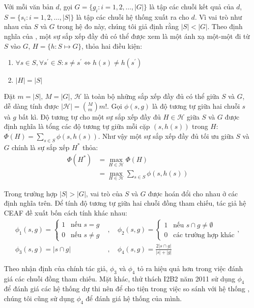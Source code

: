 Với mỗi văn bản $d$, gọi $G=\{g_i:i=1,2,\dots,|G|\}$ là tập các chuỗi kết quả của $d$, $S=\{s_i:i=1,2,\dots,|S|\}$ là tập các chuỗi hệ thống xuất ra cho $d$. Vì vai trò như nhau của $S$ và $G$ trong hệ đo này, chúng tôi giả định rằng $|S|<|G|$. Theo định nghĩa của \cite{XiaoquangLuo2005}, một sự sắp xếp đầy đủ có thể được xem là một ánh xạ một-một đi từ $S$ vào $G$, $H=\{h:S\mapsto G\}$, thỏa hai điều kiện:
\begin{enumerate}
\item $\forall s \in S,\forall s^{\prime} \in S: s\neq s^{\prime} \Leftrightarrow h(s)\neq h(s^{\prime})$
\item $|H|=|S|$
\end{enumerate}

Đặt $m=|S|,\, M=|G|$, $\mathcal{H}$ là toàn bộ những sắp xếp đầy đủ có thể giữa $S$ và $G$, dễ dàng tính được $|\mathcal{H}|=\binom{M}{m}m!$. Gọi $\phi(s,g)$ là độ tương tự giữa hai chuỗi $s$ và $g$ bất kì. Độ tương tự cho một sự sắp xếp đầy đủ $H\in\mathcal{H}$ giữa $S$ và $G$ được định nghĩa là tổng các độ tương tự giữa mỗi cặp $(s,h(s))$ trong $H$: $\Phi(H)=\sum_{s\in S} \phi(s,h(s))$. Như vậy một sự sắp xếp đầy đủ tối ưu giữa $S$ và $G$ chính là sự sắp xếp $H^*$ thỏa:
\begin{align*}
\Phi(H^*)&=\max_{H\in\mathcal{H}} \Phi(H)\\
&=\max_{H\in\mathcal{H}} \sum_{s\in S} \phi(s,h(s))
\end{align*}

Trong trường hợp $|S|>|G|$, vai trò của $S$ và $G$ được hoán đổi cho nhau ở các định nghĩa trên. Để tính độ tương tự giữa hai chuỗi đồng tham chiếu, tác giả hệ CEAF đề xuất bốn cách tính khác nhau:
\begin{align*}
\phi_1(s,g)=
\begin{cases}
	1 & \text{nếu } s = g\\
	0 & \text{nếu } s \neq g
\end{cases}&,\quad
\phi_2(s,g)=
\begin{cases}
	1 & \text{nếu } s\cap g\neq\emptyset\\
	0 & \text{các trường hợp khác}
\end{cases},\\
\phi_3(s,g)=|s\cap g|&,\quad\phi_4(s,g)=\frac{2|s\cap g|}{|s|+|g|}
\end{align*}

Theo nhận định của chính tác giả, $\phi_3$ và $\phi_4$ tỏ ra hiệu quả hơn trong việc đánh giá các chuỗi đồng tham chiếu. Mặt khác, thử thách I2B2 năm 2011 sử dụng $\phi_4$ để đánh giá các hệ thống dự thi nên để cho tiện trong việc so sánh với hệ thống \cite{YanXu2012}, chúng tôi cũng sử dụng $\phi_4$ để đánh giá hệ thống của mình.

